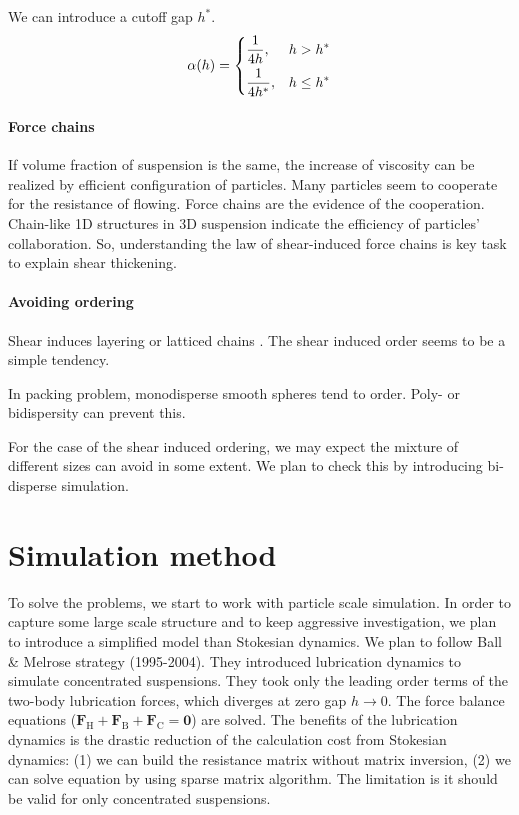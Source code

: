 \documentclass[12pt]{article}
\begin{document}
We can introduce a cutoff gap $h^{\ast}$.
\begin{equation}
 \alpha(h) =
\begin{dcases}
\displaystyle \frac{1}{4h} , & h > h^{\ast} \\
\displaystyle  \frac{1}{4h^{\ast}} , & h \leq h^{\ast} 
\end{dcases}
\end{equation}



\paragraph{Force chains}

If volume fraction of suspension is the same,
the increase of viscosity can be realized
by efficient configuration of particles.
%
Many particles seem to cooperate for the resistance of flowing.
%
Force chains are the evidence of the cooperation.
%
Chain-like 1D structures in 3D suspension
indicate the efficiency of particles' collaboration.
%
So, understanding the law of shear-induced force chains
is key task to explain shear thickening.

\paragraph{Avoiding ordering}

Shear induces layering or latticed chains \citep{Catherall_2000}.
%
The shear induced order seems to be a simple tendency.
%

In packing problem,
monodisperse smooth spheres tend to order.
%
Poly- or bidispersity can prevent this.

For the case of the shear induced ordering,
we may expect the mixture of different sizes can avoid in some extent.
%
We plan to check this by introducing bi-disperse simulation.
%

\section{Simulation method}

To solve the problems,
we start to work with particle scale simulation.
%
In order to capture some large scale structure
and to keep aggressive investigation,
we plan to introduce a simplified model than Stokesian dynamics.
%
We plan to follow Ball \& Melrose strategy (1995-2004).
%
They introduced lubrication dynamics 
to simulate concentrated suspensions.
%
They took only the leading order terms of 
the two-body lubrication forces,
which diverges at zero gap $h\to 0$.
%
The force balance equations 
($\bm{F}_{\mathrm{H}}+\bm{F}_{\mathrm{B}}+\bm{F}_{\mathrm{C}} = \bm{0}$)
are solved.
%
The benefits of the lubrication dynamics is 
the drastic reduction of the calculation cost from Stokesian dynamics:
(1) we can build the resistance matrix without matrix inversion,
(2) we can solve equation by using sparse matrix algorithm.
%
The limitation is 
it should be valid for only concentrated suspensions.
%
\end{document}
